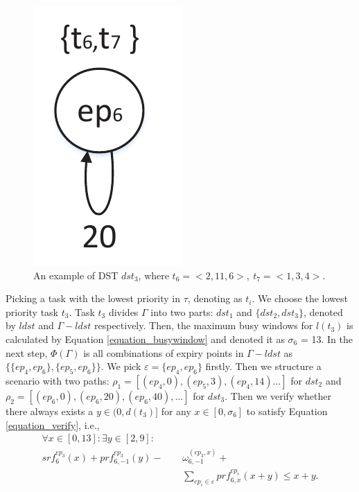 \documentclass[10pt,conference]{IEEEtran}
\begin{document}
{\begin{figure}
  \centering
  \includegraphics[scale=.5]{graphics/figure_dst3-eps-converted-to.pdf}
  \caption{An example of DST $dst_3$, where $t_6=<2,11,6>,\ t_7=<1,3,4>$.} 
  \label{figure_dst3}
\end{figure}

Picking a task with the lowest priority in $\tau$, denoting as $t_i$. We choose the lowest priority task $t_3$. Task $t_3$ divides $\Gamma$ into two parts: $dst_1$ and $\{dst_2,dst_3\}$, denoted by $ldst$ and $\Gamma-ldst$ respectively. Then, the maximum busy windows for $l(t_3)$ is calculated by Equation \ref{equation_busywindow} and denoted it as $\sigma_6$ = 13. In the next step, $\Phi(\Gamma)$ is all combinations of expiry points in $\Gamma-ldst$ as $\{\{ep_4,ep_6\},\{ep_5,ep_6\}\}$. We pick $\varepsilon=\{ep_4,ep_6\}$ firstly. Then we structure a scenario with two paths: $\rho_1=[(ep_4,0),(ep_5,3),(ep_4,14)\dots]$ for $dst_2$ and $\rho_2=[(ep_6,0),(ep_6,20),(ep_6,40),\dots]$ for $dst_3$. %
Then we verify whether there always exists a $y\in(0,d(t_3)]$ for any $x\in[0,\sigma_6]$ to satisfy Equation \ref{equation_verify}, i.e.,
\[\begin{split}
\forall x\in[0,13]:\exists y\in[2,9]:\qquad&
\\
srf^{ep_3}_6(x)+prf^{ep_3}_{6,-1}(y)-&\omega^{(ep_3,x)}_{6,-1}+
\\
&\sum\limits_{ep_i\in \varepsilon}prf^{ep_i}_{6,x}(x+y)\leq x+y.
\end{split}\]

}
\end{document}
